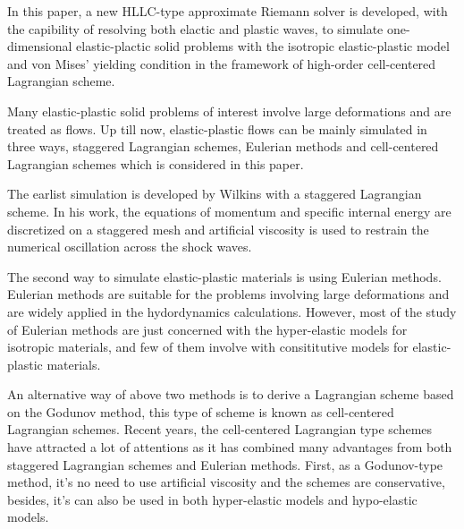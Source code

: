 \documentclass{article}
\theoremstyle{plain}\newtheorem{definition}{\sc{Definition}}
\theoremstyle{defination}\newtheorem{example}{Example}[section]
\numberwithin{equation}{section}
\numberwithin{table}{section}
\begin{document}
In this paper, a new HLLC-type approximate Riemann solver is developed, with the capibility of resolving both elactic and plastic waves, to simulate one-dimensional elastic-plactic solid problems with the isotropic elastic-plastic model\cite{} and von Mises' yielding condition in the framework of high-order cell-centered Lagrangian scheme. 

Many elastic-plastic solid  problems of interest involve large deformations and are treated as flows. Up till now, elastic-plastic flows can be mainly simulated in three ways, staggered Lagrangian schemes, Eulerian methods and cell-centered Lagrangian schemes which is considered in this paper. 

The earlist simulation is developed by Wilkins with a staggered Lagrangian scheme. In his work, the equations of momentum and specific internal energy are discretized on a staggered mesh and  artificial viscosity is used to restrain  the  numerical oscillation across the shock waves. 

The second way to simulate elastic-plastic materials is using  Eulerian methods. Eulerian methods are  suitable for the problems involving large deformations and are  widely applied in the hydordynamics calculations.  However, most of the study of Eulerian methods are just concerned with the hyper-elastic models for isotropic materials, and few of them involve with consititutive models for elastic-plastic materials. 

An alternative way of above two methods is to derive a Lagrangian scheme based on the Godunov method, this type of scheme is known as cell-centered Lagrangian schemes.  Recent years, the cell-centered Lagrangian type schemes have attracted a lot of attentions as it has combined many advantages from both staggered Lagrangian schemes and Eulerian methods. First, as a Godunov-type method, it's no need to use artificial viscosity and the schemes are conservative, besides, it's can also be used in both  hyper-elastic models and hypo-elastic models.
\end{document}

